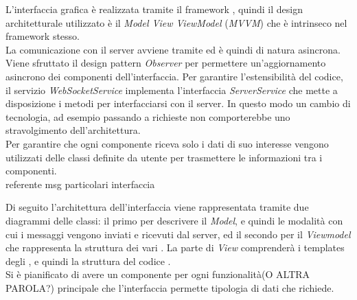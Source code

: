L'interfaccia grafica è realizzata tramite il framework , quindi il design architetturale utilizzato è il \textit{Model View ViewModel} (\textit{MVVM}) che è intrinseco nel framework stesso. \\
La comunicazione con il server avviene tramite  ed è quindi di natura asincrona. Viene sfruttato il design pattern \textit{Observer} per permettere un'aggiornamento asincrono dei componenti dell'interfaccia. Per garantire l'estensibilità del codice, il servizio \textit{WebSocketService} implementa l'interfaccia \textit{ServerService} che mette a disposizione i metodi per interfacciarsi con il server. In questo modo un cambio di tecnologia, ad esempio passando a richieste  non comporterebbe uno stravolgimento dell'architettura. \\
Per garantire che ogni componente riceva solo i dati di suo interesse vengono utilizzati delle classi definite da utente per trasmettere le informazioni tra i componenti. \\

referente msg particolari interfaccia


\newline
Di seguito l'architettura dell'interfaccia viene rappresentata tramite due diagrammi delle classi: il primo per descrivere il \textit{Model}, e quindi le modalità con cui i messaggi vengono inviati e ricevuti dal server, ed il secondo per il \textit{Viewmodel} che rappresenta la struttura dei vari . La parte di \textit{View} comprenderà i templates degli , e quindi la struttura del codice . \\
Si è pianificato di avere un componente per ogni funzionalità(O ALTRA PAROLA?) principale che l'interfaccia permette tipologia di dati che richiede.






